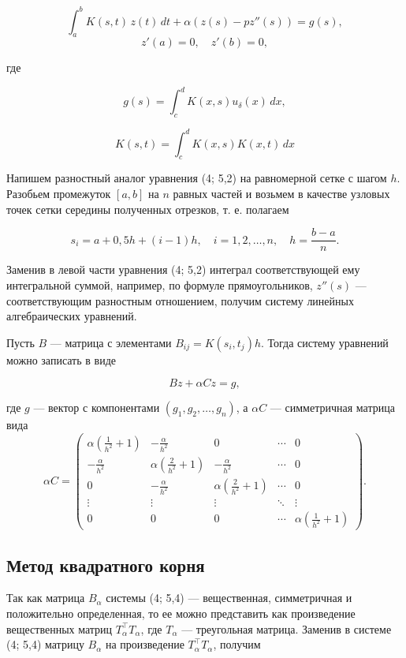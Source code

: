 \documentclass[a4paper,14pt]{extarticle}
\begin{document}
\[
\int_a^b K(s,t) \, z(t) \, dt + \alpha (z(s) - p z''(s)) = g(s), \tag{4; 5,2}
\]
\[
z'(a)=0, \quad z'(b)=0,
\]

где

\[
g(s) = \int_c^d K(x,s) u_\delta(x) \, dx,
\]

\[
K(s,t) = \int_c^d K(x,s) K(x,t) \, dx
\]

Напишем разностный аналог уравнения (4; 5,2) на равномерной сетке с шагом \(h\). Разобьем промежуток \([a,b]\) на \(n\) равных частей и возьмем в качестве узловых точек сетки середины полученных отрезков, т. е. полагаем

\[
s_i = a + 0{,}5h + (i-1)h, \quad i=1,2,\dots,n, \quad h = \frac{b-a}{n}.
\]

Заменив в левой части уравнения (4; 5,2) интеграл соответствующей ему интегральной суммой, например, по формуле прямоугольников, \(z''(s)\) — соответствующим разностным отношением, получим систему линейных алгебраических уравнений.

Пусть \(B\) — матрица с элементами \(B_{ij} = K(s_i, t_j) h\). Тогда систему уравнений можно записать в виде

\[
Bz + \alpha Cz = g, \tag{4; 5,4}
\]

где \(g\) — вектор с компонентами \((g_1, g_2, \dots, g_n)\), а \(\alpha C\) — симметричная матрица вида
\[
\alpha C = 
\begin{pmatrix}
\alpha\left(\frac{1}{h^2} + 1\right) & -\frac{\alpha}{h^2} & 0 & \cdots & 0 \\
-\frac{\alpha}{h^2} & \alpha\left(\frac{2}{h^2} + 1\right) & -\frac{\alpha}{h^2} & \cdots & 0 \\
0 & -\frac{\alpha}{h^2} & \alpha\left(\frac{2}{h^2} + 1\right) & \cdots & 0 \\
\vdots & \vdots & \vdots & \ddots & \vdots \\
0 & 0 & 0 & \cdots & \alpha\left(\frac{1}{h^2} + 1\right)
\end{pmatrix}.
\]

\subsection{Метод квадратного корня}

Так как матрица \(B_\alpha\) системы (4; 5,4) — вещественная, симметричная и положительно определенная, то ее можно представить как произведение вещественных матриц \(T_\alpha^\top T_\alpha\), где \(T_\alpha\) — треугольная матрица. Заменив в системе (4; 5,4) матрицу \(B_\alpha\) на произведение \(T_\alpha^\top T_\alpha\), получим
\end{document}
